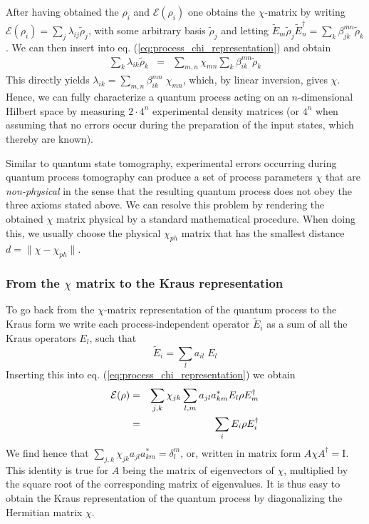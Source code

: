 After having obtained the $\rho_i$ and $\mathcal{E}(\rho_i)$ one obtains the $\chi$-matrix by writing $\mathcal{E}(\rho_i) = \sum_j \lambda_{ij} \tilde{\rho}_j$, with some arbitrary basis $\tilde{\rho}_j$ and
letting $\tilde{E}_m \tilde{\rho}_j \tilde{E}_n^\dagger = \sum_k \beta_{jk}^{mn}\tilde{\rho}_k$. We can then insert into eq. (\ref{eq:process_chi_representation}) and obtain
\begin{eqnarray}
\sum\limits_k \lambda_{ik} \tilde{\rho}_k & = & \sum\limits_{m,n} \chi_{mn} \sum\limits_k \beta_{ik}^{mn} \tilde{\rho}_k  
\end{eqnarray}
This directly yields $\lambda_{ik} = \sum_{m,n}\beta_{ik}^{mn}\; \chi_{mn}$, which, by linear inversion,  gives $\chi$. Hence, we can fully characterize a quantum process acting on an $n$-dimensional Hilbert space by measuring $2\cdot 4^n$ experimental density matrices (or $4^n$ when assuming that no errors occur during the preparation of the input states, which thereby are known).

\smallskip

Similar to quantum state tomography, experimental errors occurring during quantum process tomography can produce a set of process parameters $\chi$ that are {\it non-physical} in the sense that the resulting quantum process does not obey the three axioms stated above. We can resolve this problem by rendering the obtained $\chi$ matrix physical by a standard mathematical procedure. When doing this, we usually choose the  physical $\chi_{ph}$ matrix that has the smallest distance $d=\|\chi-\chi_{ph}\|$.

\subsubsection{From the $\chi$ matrix to the Kraus representation}

To go back from the $\chi$-matrix representation of the quantum process to the Kraus form we write each process-independent operator $\tilde{E}_i$ as a sum of all the Kraus operators $E_l$, such that
%
\begin{equation}
	\tilde{E}_i = \sum\limits_l a_{il}\; E_l
\end{equation}
%
Inserting this into eq. (\ref{eq:process_chi_representation}) we obtain
%
\begin{eqnarray}
\begin{mathcal}E\end{mathcal}(\rho) & = & \sum\limits_{j,k}\chi_{jk}\sum\limits_{l,m} a_{jl}a_{km}^* E_l \rho E_m^\dagger   \label{eq:process_chi_transformed} \\
& = & \sum\limits_i E_i \rho E^\dagger_i
\end{eqnarray}
%
We find hence that $\sum\limits_{j,k} \chi_{jk}a_{jl}a_{km}^* = \delta_l^m$, or, written in matrix form $A\chi A^\dagger = \mathrm{I}$. This identity is true for $A$ being the matrix of eigenvectors of $\chi$, multiplied by the square root of the corresponding matrix of eigenvalues. It is thus easy to obtain the Kraus representation of the quantum process by diagonalizing the Hermitian matrix $\chi$.

